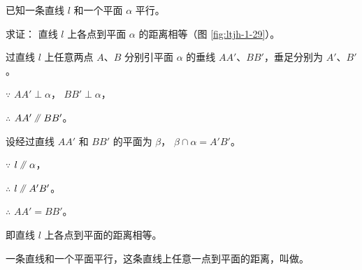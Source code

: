\liti 已知一条直线 $l$ 和一个平面 $\alpha$ 平行。

求证： 直线 $l$ 上各点到平面 $\alpha$ 的距离相等（图 \ref{fig:ltjh-1-29}）。

\zhengming 过直线 $l$ 上任意两点 $A$、$B$ 分别引平面 $\alpha$ 的垂线 $AA'$、$BB'$，垂足分别为 $A'$、$B'$。

$\because$ \quad $AA' \perp \alpha$， $BB' \perp \alpha$，

$\therefore$ \quad $AA' \pingxing BB'$。

设经过直线 $AA'$ 和 $BB'$ 的平面为 $\beta$， $\beta \cap \alpha = A'B'$。

$\because$ \quad $l \pingxing \alpha$，

$\therefore$ \quad $l \pingxing A'B'$。

$\therefore$ \quad $AA' = BB'$。

即直线 $l$ 上各点到平面的距离相等。

一条直线和一个平面平行，这条直线上任意一点到平面的距离，叫做。


\begin{lianxi}





\end{lianxi}

